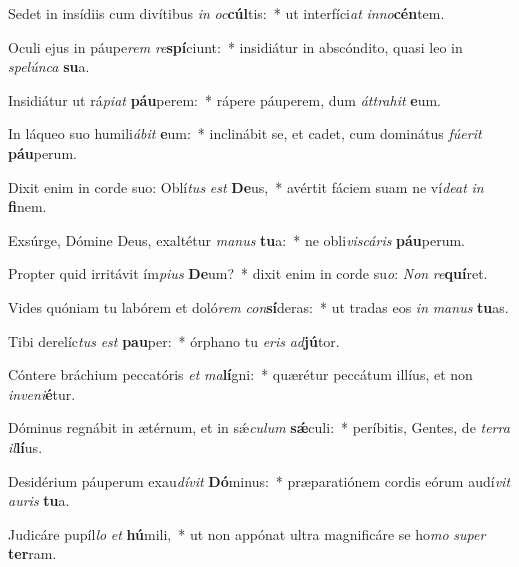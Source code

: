 \item Sedet in insídiis cum divítibus \textit{in} \textit{oc}\textbf{cúl}tis:~* ut interfíci\textit{at} \textit{in}\textit{no}\textbf{cén}tem.
\item Oculi ejus in páupe\textit{rem} \textit{re}\textbf{spí}ciunt:~* insidiátur in abscóndito, quasi leo in \textit{spe}\textit{lún}\textit{ca} \textbf{su}a.
\item Insidiátur ut rá\textit{pi}\textit{at} \textbf{páu}perem:~* rápere páuperem, dum \textit{át}\textit{tra}\textit{hit} \textbf{e}um.
\item In láqueo suo humili\textit{á}\textit{bit} \textbf{e}um:~* inclinábit se, et cadet, cum dominátus \textit{fú}\textit{e}\textit{rit} \textbf{páu}perum.
\item Dixit enim in corde suo: Oblí\textit{tus} \textit{est} \textbf{De}us,~* avértit fáciem suam ne ví\textit{de}\textit{at} \textit{in} \textbf{fi}nem.
\item Exsúrge, Dómine Deus, exaltétur \textit{ma}\textit{nus} \textbf{tu}a:~* ne obli\textit{vis}\textit{cá}\textit{ris} \textbf{páu}perum.
\item Propter quid irritávit ím\textit{pi}\textit{us} \textbf{De}um?~* dixit enim in corde su\textit{o}: \textit{Non} \textit{re}\textbf{quí}ret.
\item Vides quóniam tu labórem et doló\textit{rem} \textit{con}\textbf{sí}deras:~* ut tradas eos \textit{in} \textit{ma}\textit{nus} \textbf{tu}as.
\item Tibi derelíc\textit{tus} \textit{est} \textbf{pau}per:~* órphano tu \textit{e}\textit{ris} \textit{ad}\textbf{jú}tor.
\item Cóntere bráchium peccatóris \textit{et} \textit{ma}\textbf{lí}gni:~* quærétur peccátum illíus, et non \textit{in}\textit{ve}\textit{ni}\textbf{é}tur.
\item Dóminus regnábit in ætérnum, et in sǽ\textit{cu}\textit{lum} \textbf{sǽ}culi:~* períbitis, Gentes, de \textit{ter}\textit{ra} \textit{il}\textbf{lí}us.
\item Desidérium páuperum exau\textit{dí}\textit{vit} \textbf{Dó}minus:~* præparatiónem cordis eórum audí\textit{vit} \textit{au}\textit{ris} \textbf{tu}a.
\item Judicáre pupíl\textit{lo} \textit{et} \textbf{hú}mili,~* ut non appónat ultra magnificáre se ho\textit{mo} \textit{su}\textit{per} \textbf{ter}ram.
